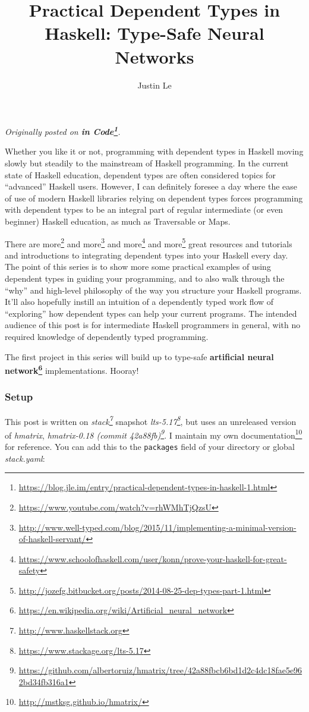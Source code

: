 \documentclass[]{article}
\title{Practical Dependent Types in Haskell: Type-Safe Neural Networks}
\author{Justin Le}
\renewcommand{\href}[2]{#2\footnote{\url{#1}}}
\begin{document}
\maketitle

\emph{Originally posted on
\textbf{\href{https://blog.jle.im/entry/practical-dependent-types-in-haskell-1.html}{in
Code}}.}

Whether you like it or not, programming with dependent types in Haskell
moving slowly but steadily to the mainstream of Haskell programming. In
the current state of Haskell education, dependent types are often
considered topics for ``advanced'' Haskell users. However, I can
definitely foresee a day where the ease of use of modern Haskell
libraries relying on dependent types forces programming with dependent
types to be an integral part of regular intermediate (or even beginner)
Haskell education, as much as Traversable or Maps.

There are \href{https://www.youtube.com/watch?v=rhWMhTjQzsU}{more} and
\href{http://www.well-typed.com/blog/2015/11/implementing-a-minimal-version-of-haskell-servant/}{more}
and
\href{https://www.schoolofhaskell.com/user/konn/prove-your-haskell-for-great-safety}{more}
and
\href{http://jozefg.bitbucket.org/posts/2014-08-25-dep-types-part-1.html}{more}
great resources and tutorials and introductions to integrating dependent
types into your Haskell every day. The point of this series is to show
more some practical examples of using dependent types in guiding your
programming, and to also walk through the ``why'' and high-level
philosophy of the way you structure your Haskell programs. It'll also
hopefully instill an intuition of a dependently typed work flow of
``exploring'' how dependent types can help your current programs. The
intended audience of this post is for intermediate Haskell programmers
in general, with no required knowledge of dependently typed programming.

The first project in this series will build up to type-safe
\textbf{\href{https://en.wikipedia.org/wiki/Artificial_neural_network}{artificial
neural network}} implementations. Hooray!

\subsubsection{Setup}\label{setup}

This post is written on \emph{\href{http://www.haskellstack.org}{stack}}
snapshot \emph{\href{https://www.stackage.org/lts-5.17}{lts-5.17}}, but
uses an unreleased version of \emph{hmatrix},
\emph{\href{https://github.com/albertoruiz/hmatrix/tree/42a88fbcb6bd1d2c4dc18fae5e962bd34fb316a1}{hmatrix-0.18
(commit 42a88fb)}}. I \href{http://mstksg.github.io/hmatrix/}{maintain
my own documentation} for reference. You can add this to the
\texttt{packages} field of your directory or global \emph{stack.yaml}:
\end{document}
